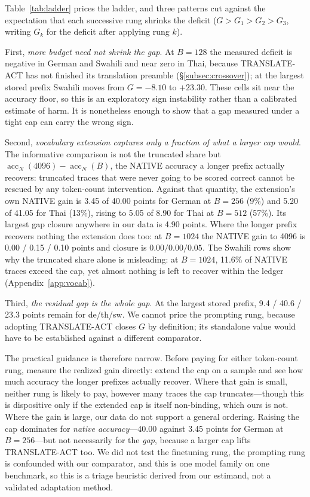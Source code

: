 \documentclass[11pt]{article}
\begin{document}
Table~\ref{tab:ladder} prices the ladder, and three patterns cut against the
expectation that each successive rung shrinks the deficit
(\(G>G_1>G_2>G_3\), writing \(G_k\) for the deficit after applying rung \(k\)).

First, \emph{more budget need not shrink the gap}. At \(B=128\) the measured
deficit is negative in German and Swahili and near zero in Thai, because
TRANSLATE-ACT has not finished its translation preamble
(\S\ref{subsec:crossover}); at the largest stored prefix Swahili moves from
\(G=-8.10\) to \(+23.30\). These cells sit near the accuracy floor, so this is
an exploratory sign instability rather than a calibrated estimate of harm. It
is nonetheless enough to show that a gap measured under a tight cap can carry
the wrong sign.

Second, \emph{vocabulary extension captures only a fraction of what a larger
cap would}. The informative comparison is not the truncated share but
\(\operatorname{acc}_N(4096)-\operatorname{acc}_N(B)\), the NATIVE accuracy a
longer prefix actually recovers: truncated traces that were never going to be
scored correct cannot be rescued by any token-count intervention. Against that
quantity, the extension's own NATIVE gain is 3.45 of 40.00 points for German at
\(B=256\) (9\%) and 5.20 of 41.05 for Thai (13\%), rising to 5.05 of 8.90 for
Thai at \(B=512\) (57\%). Its largest gap closure anywhere in our data is 4.90
points. Where the longer prefix recovers nothing the extension does too: at
\(B=1024\) the NATIVE gain to 4096 is 0.00 / 0.15 / 0.10 points and closure is
\(0.00/0.00/0.05\). The Swahili rows show why the truncated share alone is
misleading: at \(B=1024\), 11.6\% of NATIVE traces exceed the cap, yet almost
nothing is left to recover within the ledger (Appendix~\ref{app:vocab}).

Third, \emph{the residual gap is the whole gap}. At the largest stored prefix,
9.4 / 40.6 / 23.3 points remain for de/th/sw. We cannot price the prompting
rung, because adopting TRANSLATE-ACT closes \(G\) by definition; its standalone
value would have to be established against a different comparator.

The practical guidance is therefore narrow. Before paying for either
token-count rung, measure the realized gain directly: extend the cap on a
sample and see how much accuracy the longer prefixes actually recover. Where
that gain is small, neither rung is likely to pay, however many traces the cap
truncates---though this is dispositive only if the extended cap is itself
non-binding, which ours is not. Where the gain is large, our data do not
support a general ordering. Raising the cap dominates for \emph{native
accuracy}---40.00 against 3.45 points for German at \(B=256\)---but not
necessarily for the \emph{gap}, because a larger cap lifts TRANSLATE-ACT too.
We did not test the finetuning rung, the prompting rung is confounded with our
comparator, and this is one model family on one benchmark, so this is a triage
heuristic derived from our estimand, not a validated adaptation method.
\end{document}
